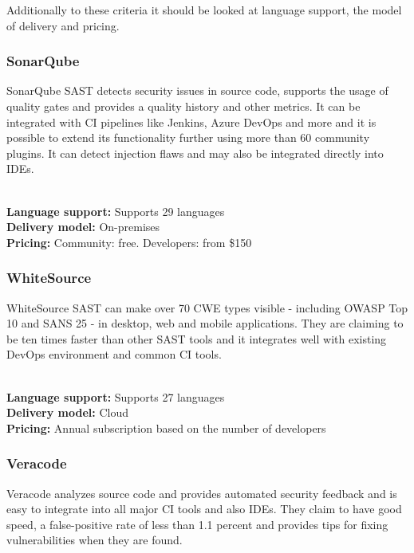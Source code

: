 \documentclass[conference]{IEEEtran}
\begin{document}
Additionally to these criteria it should be looked at language support, the model of delivery and pricing.\\

\noindent
\subsubsection{SonarQube \cite{sast1}}

SonarQube SAST detects security issues in source code, supports the usage of quality gates and provides a quality history and other metrics. It can be integrated with CI pipelines like Jenkins, Azure DevOps and more and it is possible to extend its functionality further using more than 60 community plugins. It can detect injection flaws and may also be integrated directly into IDEs. 

\noindent\\
\textbf{Language support:} Supports 29 languages
\noindent\\
\textbf{Delivery model:} On-premises
\noindent\\
\textbf{Pricing:} Community: free. Developers: from \$150
\\

\noindent
\subsubsection{WhiteSource \cite{sast2}}

WhiteSource SAST can make over 70 CWE types visible - including OWASP Top 10 and SANS 25 - in desktop, web and mobile applications. They are claiming to be ten times faster than other SAST tools and it integrates well with existing DevOps environment and common CI tools.

\noindent\\
\textbf{Language support:} Supports 27 languages
\noindent\\
\textbf{Delivery model:} Cloud
\noindent\\
\textbf{Pricing:} Annual subscription based on the number of developers
\\

\noindent
\subsubsection{Veracode \cite{sast3}}

Veracode analyzes source code and provides automated security feedback and is easy to integrate into all major CI tools and also IDEs. They claim to have good speed, a false-positive rate of less than 1.1 percent and provides tips for fixing vulnerabilities when they are found.
\end{document}
